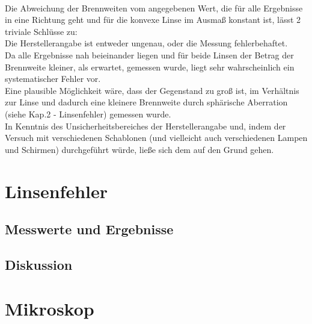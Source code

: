\documentclass[12pt,a4paper]{article}
\begin{document}
\begin{multicols}{2}
\\
Die Abweichung der Brennweiten vom angegebenen Wert, die für alle Ergebnisse in eine Richtung geht und für die konvexe Linse im Ausmaß konstant ist, lässt 2 triviale Schlüsse zu: \\
Die Herstellerangabe ist entweder ungenau, oder die Messung fehlerbehaftet.\\
Da alle Ergebnisse nah beieinander liegen und für beide Linsen der Betrag der Brennweite kleiner, als erwartet, gemessen wurde, liegt sehr wahrscheinlich ein systematischer Fehler vor. \\
Eine plausible Möglichkeit wäre, dass der Gegenstand zu groß ist, im Verhältnis zur Linse und dadurch eine kleinere Brennweite durch sphärische Aberration (siehe Kap.2 - Linsenfehler) gemessen wurde.\\
In Kenntnis des Unsicherheitsbereiches der Herstellerangabe und, indem der Versuch mit verschiedenen Schablonen (und vielleicht auch verschiedenen Lampen und Schirmen) durchgeführt würde, ließe sich dem auf den Grund gehen.


\section{Linsenfehler}

\subsection{Messwerte und Ergebnisse}

\subsection{Diskussion}

\section{Mikroskop}


\end{multicols}
\end{document}
